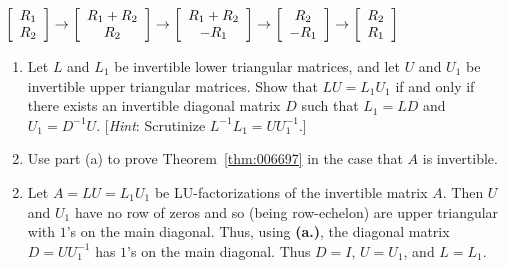 \begin{multicols}{2}
\begin{ex}
\begin{sol}
$\left[ \begin{array}{c}
R_{1} \\
R_{2}
\end{array} \right] \rightarrow
\left[ \begin{array}{c}
R_{1} + R_{2} \\
R_{2}
\end{array} \right] \rightarrow
\left[ \begin{array}{c}
R_{1} + R_{2} \\
-R_{1}
\end{array} \right] \rightarrow
\left[ \begin{array}{c}
R_{2} \\
-R_{1}
\end{array} \right] \rightarrow
\left[ \begin{array}{c}
R_{2} \\
R_{1}
\end{array} \right]$
\end{sol}
\end{ex}

\begin{ex}
\begin{enumerate}[label={\alph*.}]
\item Let $L$ and $L_{1}$ be invertible lower triangular matrices, and let $U$ and $U_{1}$ be invertible upper triangular matrices. Show that $LU = L_{1}U_{1}$ if and only if there exists an invertible diagonal matrix $D$ such that $L_{1} = LD$ and $U_{1} = D^{-1}U$. [\textit{Hint}: Scrutinize $L^{-1}L_{1} = UU_{1}^{-1}$.]

\item Use part (a) to prove Theorem~\ref{thm:006697} in the case that $A$ is invertible.

\end{enumerate}
\begin{sol}
\begin{enumerate}[label={\alph*.}]
\setcounter{enumi}{1}
\item  Let $A = LU = L_{1}U_{1}$ be LU-factorizations of the invertible matrix $A$. Then $U$ and $U_{1}$ have no row of zeros and so (being row-echelon) are upper triangular with $1$'s on the main diagonal. Thus, using \textbf{(a.)}, the diagonal matrix $D = UU_{1}^{-1}$ has $1$'s on the main diagonal. Thus $D = I$, $U = U_{1}$, and $L = L_{1}$.

\end{enumerate}
\end{sol}
\end{ex}


\end{multicols}
